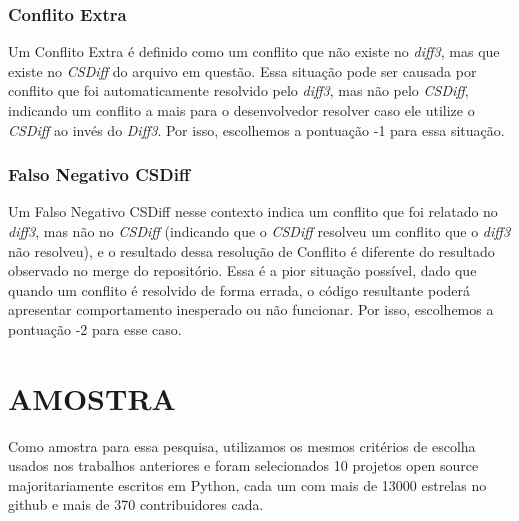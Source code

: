 \subsubsection{Conflito Extra}
Um Conflito Extra é definido como um conflito que não existe
no \emph{diff3}, mas que existe no \emph{CSDiff} do arquivo em questão. Essa
situação pode ser causada por conflito que foi automaticamente
resolvido pelo \emph{diff3}, mas não pelo \emph{CSDiff}, indicando um conflito
a mais para o desenvolvedor resolver caso ele utilize o \emph{CSDiff}
ao invés do \emph{Diff3}. Por isso, escolhemos a pontuação -1 para essa
situação.
\subsubsection{Falso Negativo CSDiff}
Um Falso Negativo CSDiff nesse contexto indica um conflito que foi relatado no
\emph{diff3}, mas não no \emph{CSDiff} (indicando que
o \emph{CSDiff} resolveu um conflito que o \emph{diff3} não resolveu),
e o resultado dessa resolução de Conflito é diferente do resultado
observado no merge do repositório. Essa é a pior situação possível,
dado que quando um conflito é resolvido de forma errada,
o código resultante poderá apresentar comportamento inesperado ou não funcionar. Por
isso, escolhemos a pontuação -2 para esse caso.

\section{AMOSTRA}
Como amostra para essa pesquisa, utilizamos os mesmos critérios de escolha
usados nos trabalhos anteriores e foram selecionados 10 projetos open source majoritariamente escritos em Python,
cada um com mais de 13000 estrelas no github e mais de 370 contribuidores cada.

